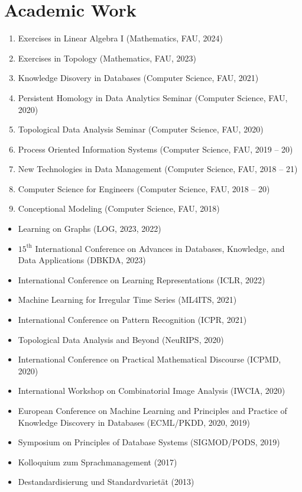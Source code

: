 \documentclass[a4paper,11pt]{article}
\newcommand{\years}[1]{\marginnote{\scriptsize #1}}
\begin{document}
\section*{Academic Work}
\years{Teaching}
\vspace{-2pt}
\begin{enumerate}[noitemsep, leftmargin=*]
    \item Exercises in Linear Algebra I (Mathematics, FAU, 2024)
    \item Exercises in Topology (Mathematics, FAU, 2023)
    \item Knowledge Disovery in Databases (Computer Science, FAU, 2021)
    \item Persistent Homology in Data Analytics Seminar (Computer Science, FAU, 2020)
    \item Topological Data Analysis Seminar (Computer Science, FAU, 2020)
    \item Process Oriented Information Systems (Computer Science, FAU, 2019 -- 20)
    \item New Technologies in Data Management (Computer Science, FAU, 2018 -- 21)
    \item Computer Science for Engineers (Computer Science, FAU, 2018 -- 20)
    \item Conceptional Modeling (Computer Science, FAU, 2018)
\end{enumerate}
\vspace{10pt}

\years{Conferences}
\vspace{-2pt}
\begin{itemize}[noitemsep, leftmargin=*]
    \item Learning on Graphs (LOG, 2023, 2022)
    \item $15^{\text{th}}$ International Conference on Advances in Databases, Knowledge,
and Data Applications (DBKDA, 2023)
    \item International Conference on Learning Representations (ICLR, 2022)
    \item Machine Learning for Irregular Time Series (ML4ITS, 2021)
    \item International Conference on Pattern Recognition (ICPR, 2021)
    \item Topological Data Analysis and Beyond (NeuRIPS, 2020)
    \item International Conference on Practical Mathematical Discourse (ICPMD, 2020)
    \item International Workshop on Combinatorial Image Analysis (IWCIA, 2020)
    \item European Conference on Machine Learning and Principles and Practice of Knowledge Discovery in Databases (ECML/PKDD, 2020, 2019)
    \item Symposium on Principles of Database Systems (SIGMOD/PODS, 2019)
    \item Kolloquium zum Sprachmanagement (2017)
    \item Destandardisierung und Standardvarietät (2013)
\end{itemize}
\vspace{10pt}
\end{document}
